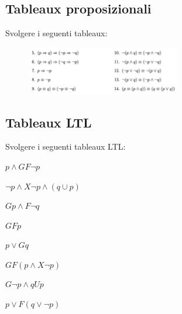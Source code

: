 \documentclass[12pt,a4paper]{article}
\begin{document}
    \subsection{Tableaux proposizionali}
    \begin{Exercise}
    Svolgere i seguenti tableaux:
        \begin{figure}[h!]
            \centering
            \includegraphics[width=0.6\textwidth]{images/esTableaux.jpeg}
            \label{fig:esTableaux1}
        \end{figure}
    \end{Exercise}
       
    
    
    \subsection{Tableaux LTL}
    \begin{Exercise}
    Svolgere i seguenti tableaux LTL:
        \begin{enumerate}
        \begin{minipage}{0.49\linewidth}
            \item \(p \land GF \neg p\)
            \item $\neg p \land X \neg p \land (q \cup p)$
            \item \(G p \land F \neg q\)
            \item \(G F p\)
        \end{minipage}
        \begin{minipage}{0.49\linewidth}
            \item \(p \lor G q\)
            \item \(G F(p \land X \neg p)\)
            \item \(G \neg p \land q U p\)
            \item $p \lor F(q \lor \neg p)$
        \end{minipage}
        \end{enumerate}
    \end{Exercise}
    
\end{document}
